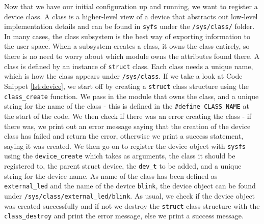 \documentclass[a4paper,oneside,onecolumn]{article}
\newcommand{\code}[1]{\colorbox{codegray}{\texttt{#1}}}
\begin{document}
Now that we have our initial configuration up and running, we want to register a device class. A class is a higher-level view of a device that abstracts out low-level implementation details and can be found in \texttt{syfs} under the \texttt{/sys/class/} folder. In many cases, the class subsystem is the best way of exporting information to the user space. When a subsystem creates a class, it owns the class entirely, so there is no need to worry about which module owns the attributes found there.
\newline
A class is defined by an instance of \code{struct} class. Each class needs a unique name, which is how the class appears under \texttt{/sys/class}.
\newline
\newline
If we take a look at Code Snippet \ref{lst:device}, we start off by creating a \code{struct} class structure using the \code{class\_create} function. We pass in the module that owns the class, and a unique string for the name of the class - this is defined in the \code{\#define CLASS\_NAME} at the start of the code. We then check if there was an error creating the class - if there was, we print out an error message saying that the creation of the device class has failed and return the error, otherwise we print a success statement, saying it was created.
\newline
\newline
We then go on to register the device object with \texttt{sysfs} using the \code{device\_create} which takes as arguments, the class it should be registered to, the parent struct device, the \texttt{dev\_t} to be added, and a unique string for the device name. As name of the class has been defined as \texttt{external\_led} and the name of the device \texttt{blink}, the device object can be found under \texttt{/sys/class/external\_led/blink}.
\newline
As usual, we check if the device object was created successfully and if not we destroy the \code{struct} class structure with the \code{class\_destroy} and print the error message, else we print a success message.
\end{document}
